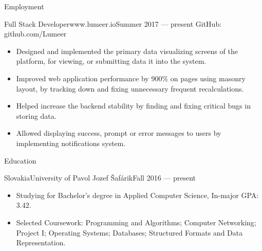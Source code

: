 \documentclass[]{mcdowellcv}
\begin{document}
	\makeheader
	
	\begin{cvsection}{Employment}
		\begin{cvsubsection}{Full Stack Developer}{www.lumeer.io}{Summer 2017 — present}
			GitHub: github.com/Lumeer
			\begin{itemize}
				\item Designed and implemented the primary data visualizing screens of the platform, for viewing, or submitting data it into the system.
				\item Improved web application performance by 900\% on pages using masonry layout, by tracking down and fixing unnecessary frequent recalculations.
				\item Helped increase the backend stability by finding and fixing critical bugs in storing data.
				\item Allowed displaying success, prompt or error messages to users by implementing notifications system.
			\end{itemize}
		\end{cvsubsection}
	\end{cvsection}
	
	\begin{cvsection}{Education}
		\begin{cvsubsection}{Slovakia}{University of Pavol Jozef Šafárik}{Fall 2016 — present}
			\begin{itemize}
				\item Studying for Bachelor's degree in Applied Computer Science, In-major GPA: 3.42.
				\item Selected Coursework: Programming and Algorithms; Computer Networking; Project I; Operating Systems; Databases; Structured Formats and Data Representation.
			\end{itemize}
		\end{cvsubsection}
	\end{cvsection}
	
\end{document}
